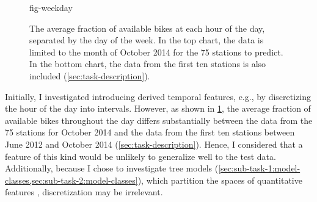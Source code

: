 \begin{figure}
  \centering
  {fig-weekday}
  \caption{
    The average fraction of available bikes at each hour of the day, separated by the day of the week.
    In the top chart, the data is limited to the month of October 2014 for the 75 stations
    to predict.
    In the bottom chart, the data from the first ten stations is also included
    (\cref{sec:task-description}).
  }
  \label{fig-weekday}
\end{figure}

Initially, I investigated introducing derived temporal features, e.g., by discretizing
the hour of the day into intervals.
However, as shown in \cref{fig-weekday}, the average fraction of available bikes
throughout the day differs substantially between the data from the 75 stations for
October 2014 and the data from the first ten stations between June 2012 and October
2014 (\cref{sec:task-description}).
Hence, I considered that a feature of this kind would be unlikely to generalize well to
the test data.
Additionally, because I chose to investigate tree models
(\cref{sec:sub-task-1:model-classes,sec:sub-task-2:model-classes}), which partition the
spaces of quantitative features \parencite[155]{Flach2012}, discretization may be
irrelevant.
